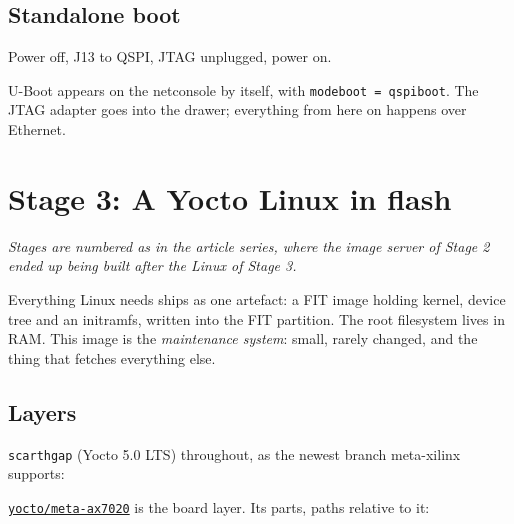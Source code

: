 \documentclass[11pt,a4paper,oneside]{article}
\newcommand{\cmd}[1]{\texttt{#1}}
\newcommand{\repo}{https://github.com/MaxClerkwell/ax7020-bringup}
\newcommand{\rfile}[1]{\href{\repo/blob/master/#1}{\color{bluemid}\nolinkurl{#1}}}
\begin{document}
\subsection{Standalone boot}

Power off, J13 to QSPI, JTAG unplugged, power on.

\begin{checkpoint}
U-Boot appears on the netconsole by itself, with \cmd{modeboot = qspiboot}.
The JTAG adapter goes into the drawer; everything from here on happens over
Ethernet.
\end{checkpoint}

\section{Stage 3: A Yocto Linux in flash}

\emph{Stages are numbered as in the article series, where the image server of
Stage 2 ended up being built after the Linux of Stage 3.}

Everything Linux needs ships as one artefact: a FIT image holding kernel,
device tree and an initramfs, written into the FIT partition. The root
filesystem lives in RAM. This image is the \emph{maintenance system}: small,
rarely changed, and the thing that fetches everything else.

\subsection{Layers}

\cmd{scarthgap} (Yocto 5.0 LTS) throughout, as the newest branch meta-xilinx
supports:


\rfile{yocto/meta-ax7020} is the board layer. Its parts, paths relative to it:
\end{document}
